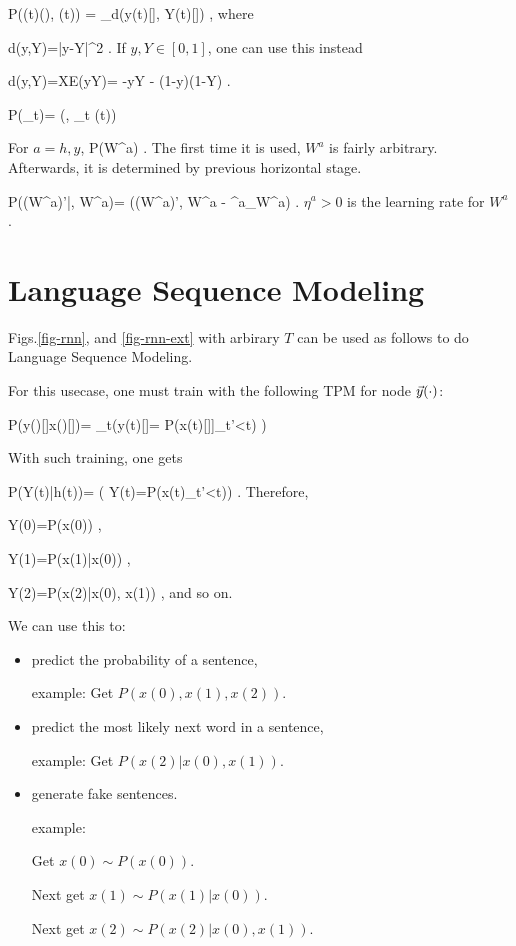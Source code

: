 \beq\color{blue}
P(\cale(t)\cond \vecy(\cdot), (t))
=
\sum_\sigma d(y(t)[\sigma], Y(t)[\sigma])
\;,
\eeq
where 

\beq
d(y,Y)=|y-Y|^2
\;.
\label{eq-d-err-sq}
\eeq
If $y, Y\in [0,1]$, 
one can use this instead

\beq
d(y,Y)=XE(y\rarrow Y)=
-y\ln Y - (1-y)\ln (1-Y)
\;.
\eeq

\beq\color{blue}
P(\cale\cond [\cale(t)]_{\forall t})=
\delta(\cale, \sum_t \cale(t))
\eeq

For $a=h,y$,
\beq\color{blue}
P(W^a)
\;.
\eeq
The first time it is used,
$W^a$ is fairly arbitrary. Afterwards,
it is determined by previous 
horizontal
stage.

\beq\color{blue}
P((W^a)'|\cale, W^a)=
\delta((W^a)', W^a -
\eta ^a\partial_{W^a}\cale)
\;.
\eeq
$\eta ^a>0$ is the learning rate
for $W^a$.

\section{Language Sequence Modeling}

Figs.\ref{fig-rnn}, and \ref{fig-rnn-ext}
with arbirary $T$ can be used 
as follows to do
Language Sequence Modeling.

For this usecase, one must
train with the following
TPM for node ${\vec{y}}(\cdot)$:

\beq\color{blue}
P(y(\cdot)[\sigma]\cond x(\cdot)[\sigma])=
\prod_t\indi(\;\;\;y(t)[\sigma]=
P(x(t)[\sigma]\cond [x(t')[\sigma]]_{t'<t})
\;\;\;)
\eeq

With such training, one gets

\beq
P(Y(t)|h(t))=
\indi(\;\;\;
Y(t)=P(x(t)\cond [x(t')]_{t'<t})\;\;\;)
\;.
\eeq
Therefore,

\beq
Y(0)=P(x(0))
\;,
\eeq

\beq
Y(1)=P(x(1)|x(0))
\;,
\eeq

\beq
Y(2)=P(x(2)|x(0), x(1))
\;,
\eeq
and so on.

We can use this to: 
\begin{itemize}
\item
predict the probability 
of a sentence,

example: Get $P(x(0), x(1), x(2))$.
\item
predict 
the most likely 
next word in a sentence,

example: Get $P(x(2)| x(0), x(1))$.
\item generate fake sentences.

example: 

Get $x(0)\sim P(x(0))$.

Next get $x(1)\sim P(x(1)|x(0))$.

Next get $x(2)\sim P(x(2)|x(0), x(1))$.


\end{itemize}

